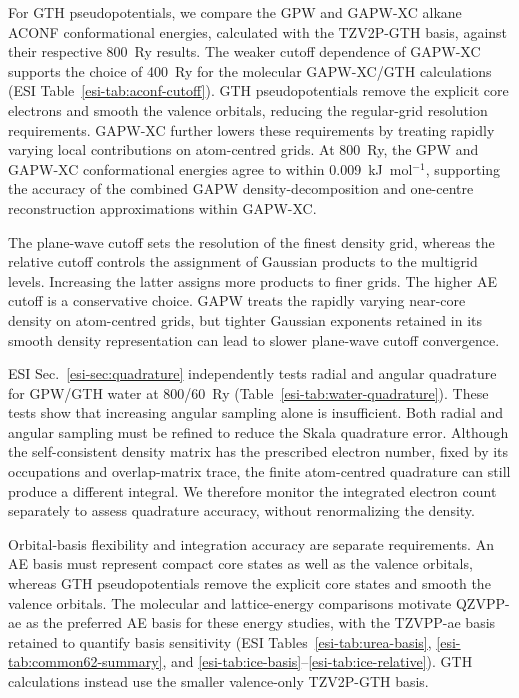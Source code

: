 \documentclass[10pt,a4paper,twocolumn]{article}
\begin{document}
For GTH pseudopotentials, we compare the GPW and GAPW-XC alkane ACONF conformational energies, calculated with the TZV2P-GTH basis, against their respective 800~Ry results. The weaker cutoff dependence of GAPW-XC supports the choice of 400~Ry for the molecular GAPW-XC/GTH calculations (ESI Table~\ref{esi-tab:aconf-cutoff}). GTH pseudopotentials remove the explicit core electrons and smooth the valence orbitals, reducing the regular-grid resolution requirements. GAPW-XC further lowers these requirements by treating rapidly varying local contributions on atom-centred grids. At 800~Ry, the GPW and GAPW-XC conformational energies agree to within 0.009~kJ~mol$^{-1}$, supporting the accuracy of the combined GAPW density-decomposition and one-centre reconstruction approximations within GAPW-XC.

The plane-wave cutoff sets the resolution of the finest density grid, whereas the relative cutoff controls the assignment of Gaussian products to the multigrid levels. Increasing the latter assigns more products to finer grids. The higher AE cutoff is a conservative choice. GAPW treats the rapidly varying near-core density on atom-centred grids, but tighter Gaussian exponents retained in its smooth density representation can lead to slower plane-wave cutoff convergence.\cite{CP2KMadeSimple2026}

ESI Sec.~\ref{esi-sec:quadrature} independently tests radial and angular quadrature for GPW/GTH water at 800/60~Ry (Table~\ref{esi-tab:water-quadrature}). These tests show that increasing angular sampling alone is insufficient. Both radial and angular sampling must be refined to reduce the Skala quadrature error. Although the self-consistent density matrix has the prescribed electron number, fixed by its occupations and overlap-matrix trace, the finite atom-centred quadrature can still produce a different integral. We therefore monitor the integrated electron count separately to assess quadrature accuracy, without renormalizing the density.

Orbital-basis flexibility and integration accuracy are separate requirements. An AE basis must represent compact core states as well as the valence orbitals, whereas GTH pseudopotentials remove the explicit core states and smooth the valence orbitals. The molecular and lattice-energy comparisons motivate QZVPP-ae as the preferred AE basis for these energy studies, with the TZVPP-ae basis retained to quantify basis sensitivity (ESI Tables~\ref{esi-tab:urea-basis}, \ref{esi-tab:common62-summary}, and \ref{esi-tab:ice-basis}--\ref{esi-tab:ice-relative}). GTH calculations instead use the smaller valence-only TZV2P-GTH basis.
\end{document}
